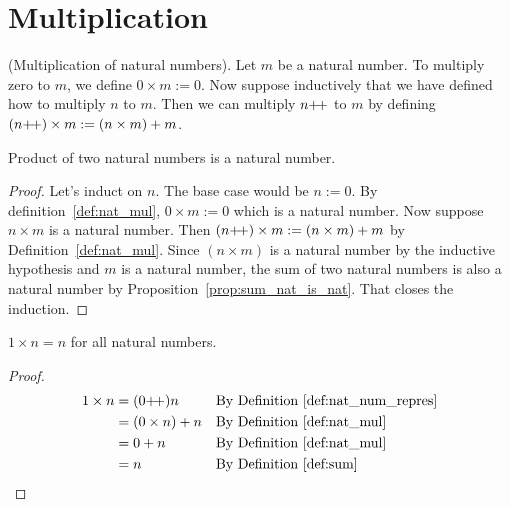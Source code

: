 
\section{Multiplication}
\begin{definition}
     \textup{(Multiplication of natural numbers)}. Let $m$ be a natural number. To multiply zero to $m$, we define $0 \times m := 0$. Now suppose inductively that we have defined how to multiply $n$ to $m$. Then we can multiply $n\operatorname{\!+\!+}$ to $m$ by defining $(n\operatorname{\!+\!+}) \times m :=(n \times m) + m$.\label{def:nat_mul}
\end{definition}

\begin{subsequence}
    \begin{proposition}
        Product of two natural numbers is a natural number.\label{prop:mul_nat_is_nat}
    \end{proposition}
    \begin{proof}
        Let's induct on $n$. The base case would be $n:= 0$. By definition~\ref{def:nat_mul}, $0\times m := 0$ which is a natural number. Now suppose $n \times m$ is a natural number. Then $\left(n\operatorname{\!+\!+}\right) \times m := \left(n \times m\right) + m$ by Definition~\ref{def:nat_mul}. Since $\left(n \times m\right)$ is a natural number by the inductive hypothesis and $m$ is a natural number, the sum of two natural numbers is also a natural number by Proposition~\ref{prop:sum_nat_is_nat}. That closes the induction.
    \end{proof}
    \begin{lemma}
        $1\times n= n$ for all natural numbers.\label{lem:nat_mul_1_identity} 
    \end{lemma}
    \begin{proof}
        \begin{align*}
            1\times n &= (0\operatorname{\!+\!+}) n &&  \text{By Definition~\ref{def:nat_num_repres}}\\
            &= (0 \times n) + n && \text{By Definition~\ref{def:nat_mul}}\\
            &= 0 + n && \text{By Definition~\ref{def:nat_mul}}\\
            &= n && \text{By Definition~\ref{def:sum}}
        \end{align*}
    \end{proof}
\end{subsequence}
